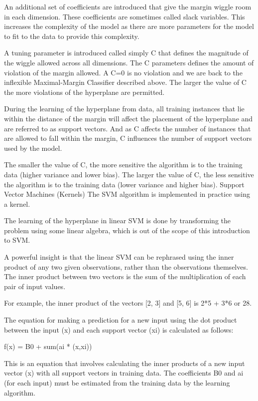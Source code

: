 \documentclass[12pt]{article}
\begin{document}
An additional set of coefficients are introduced that give the margin wiggle room in each dimension. These coefficients are sometimes called slack variables. This increases the complexity of the model as there are more parameters for the model to fit to the data to provide this complexity.

A tuning parameter is introduced called simply C that defines the magnitude of the wiggle allowed across all dimensions. The C parameters defines the amount of violation of the margin allowed. A C=0 is no violation and we are back to the inflexible Maximal-Margin Classifier described above. The larger the value of C the more violations of the hyperplane are permitted.

During the learning of the hyperplane from data, all training instances that lie within the distance of the margin will affect the placement of the hyperplane and are referred to as support vectors. And as C affects the number of instances that are allowed to fall within the margin, C influences the number of support vectors used by the model.

The smaller the value of C, the more sensitive the algorithm is to the training data (higher variance and lower bias).
The larger the value of C, the less sensitive the algorithm is to the training data (lower variance and higher bias).
Support Vector Machines (Kernels)
The SVM algorithm is implemented in practice using a kernel.

The learning of the hyperplane in linear SVM is done by transforming the problem using some linear algebra, which is out of the scope of this introduction to SVM.

A powerful insight is that the linear SVM can be rephrased using the inner product of any two given observations, rather than the observations themselves. The inner product between two vectors is the sum of the multiplication of each pair of input values.

For example, the inner product of the vectors [2, 3] and [5, 6] is 2*5 + 3*6 or 28.

The equation for making a prediction for a new input using the dot product between the input (x) and each support vector (xi) is calculated as follows:

f(x) = B0 + sum(ai * (x,xi))

This is an equation that involves calculating the inner products of a new input vector (x) with all support vectors in training data. The coefficients B0 and ai (for each input) must be estimated from the training data by the learning algorithm.
\end{document}
